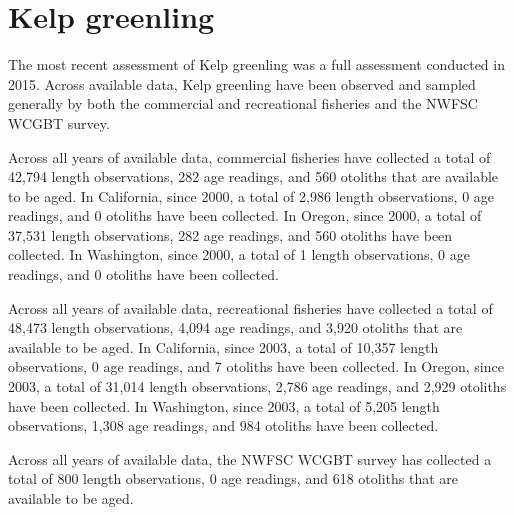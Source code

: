 \documentclass[11pt,
  english,
  letterpaper,
]{article}
\begin{document}

\hypertarget{kelp-greenling}{%
\section{Kelp greenling}\label{kelp-greenling}}

\leavevmode\tagmcend\tagstructend


The most recent assessment of Kelp greenling was a full assessment conducted in 2015. Across available data, Kelp greenling have been observed and sampled generally by both the commercial and recreational fisheries and the NWFSC WCGBT survey.

\leavevmode\tagmcend\tagstructend\par


Across all years of available data, commercial fisheries have collected a total of 42,794 length observations, 282 age readings, and 560 otoliths that are available to be aged. In California, since 2000, a total of 2,986 length observations, 0 age readings, and 0 otoliths have been collected. In Oregon, since 2000, a total of 37,531 length observations, 282 age readings, and 560 otoliths have been collected. In Washington, since 2000, a total of 1 length observations, 0 age readings, and 0 otoliths have been collected.

\leavevmode\tagmcend\tagstructend\par


Across all years of available data, recreational fisheries have collected a total of 48,473 length observations, 4,094 age readings, and 3,920 otoliths that are available to be aged. In California, since 2003, a total of 10,357 length observations, 0 age readings, and 7 otoliths have been collected. In Oregon, since 2003, a total of 31,014 length observations, 2,786 age readings, and 2,929 otoliths have been collected. In Washington, since 2003, a total of 5,205 length observations, 1,308 age readings, and 984 otoliths have been collected.

\leavevmode\tagmcend\tagstructend\par


Across all years of available data, the NWFSC WCGBT survey has collected a total of 800 length observations, 0 age readings, and 618 otoliths that are available to be aged.
\end{document}
